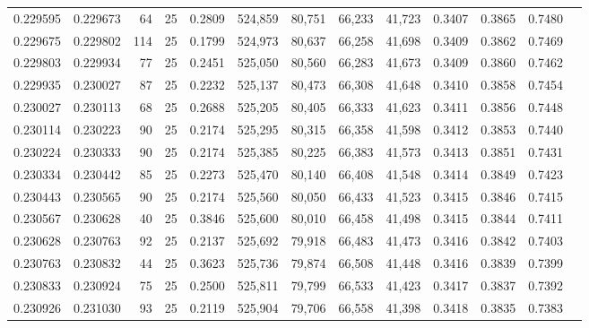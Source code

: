 \begin{tabular}{rrrrrrrrrrrrr}
0.229595 & 0.229673 &    64 &  25 &                                     0.2809 & 524,859 &  80,751 &  66,233 &  41,723 & 0.3407 & 0.3865 & 0.7480 \\
0.229675 & 0.229802 &   114 &  25 &                                     0.1799 & 524,973 &  80,637 &  66,258 &  41,698 & 0.3409 & 0.3862 & 0.7469 \\
0.229803 & 0.229934 &    77 &  25 &                                     0.2451 & 525,050 &  80,560 &  66,283 &  41,673 & 0.3409 & 0.3860 & 0.7462 \\
0.229935 & 0.230027 &    87 &  25 &                                     0.2232 & 525,137 &  80,473 &  66,308 &  41,648 & 0.3410 & 0.3858 & 0.7454 \\
0.230027 & 0.230113 &    68 &  25 &                                     0.2688 & 525,205 &  80,405 &  66,333 &  41,623 & 0.3411 & 0.3856 & 0.7448 \\
0.230114 & 0.230223 &    90 &  25 &                                     0.2174 & 525,295 &  80,315 &  66,358 &  41,598 & 0.3412 & 0.3853 & 0.7440 \\
0.230224 & 0.230333 &    90 &  25 &                                     0.2174 & 525,385 &  80,225 &  66,383 &  41,573 & 0.3413 & 0.3851 & 0.7431 \\
0.230334 & 0.230442 &    85 &  25 &                                     0.2273 & 525,470 &  80,140 &  66,408 &  41,548 & 0.3414 & 0.3849 & 0.7423 \\
0.230443 & 0.230565 &    90 &  25 &                                     0.2174 & 525,560 &  80,050 &  66,433 &  41,523 & 0.3415 & 0.3846 & 0.7415 \\
0.230567 & 0.230628 &    40 &  25 &                                     0.3846 & 525,600 &  80,010 &  66,458 &  41,498 & 0.3415 & 0.3844 & 0.7411 \\
0.230628 & 0.230763 &    92 &  25 &                                     0.2137 & 525,692 &  79,918 &  66,483 &  41,473 & 0.3416 & 0.3842 & 0.7403 \\
0.230763 & 0.230832 &    44 &  25 &                                     0.3623 & 525,736 &  79,874 &  66,508 &  41,448 & 0.3416 & 0.3839 & 0.7399 \\
0.230833 & 0.230924 &    75 &  25 &                                     0.2500 & 525,811 &  79,799 &  66,533 &  41,423 & 0.3417 & 0.3837 & 0.7392 \\
0.230926 & 0.231030 &    93 &  25 &                                     0.2119 & 525,904 &  79,706 &  66,558 &  41,398 & 0.3418 & 0.3835 & 0.7383 \\

\end{tabular}
